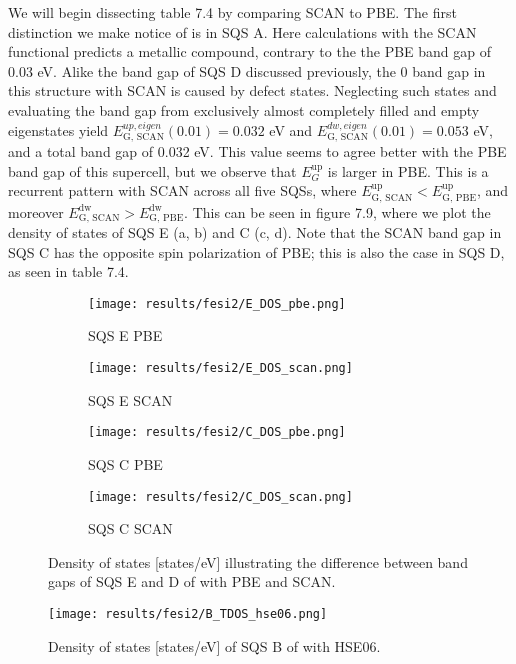 We will begin dissecting table 7.4 by comparing SCAN to PBE. The first distinction we make notice of is in SQS A. Here calculations with the SCAN functional predicts a metallic compound, contrary to the the PBE band gap of 0.03 eV. Alike the band gap of SQS D discussed previously, the 0 band gap in this structure with SCAN is caused by defect states. Neglecting such states and evaluating the band gap from exclusively almost completely filled and empty eigenstates yield $E_\text{G, SCAN} ^{up, eigen}(0.01) = 0.032$ eV and $E_\text{G, SCAN} ^{dw, eigen}(0.01) = 0.053$ eV, and a total band gap of 0.032 eV. This value seems to agree better with the PBE band gap of this supercell, but we observe that $E_G ^\text{up}$ is larger in PBE.  This is a recurrent pattern with SCAN across all five SQSs, where $E_\text{G, SCAN} ^\text{up} < E_\text{G, PBE} ^\text{up}$, and moreover $E_\text{G, SCAN} ^\text{dw} > E_\text{G, PBE} ^\text{dw}$. This can be seen in figure 7.9, where we plot the density of states of SQS E (a, b) and C (c, d). Note that the SCAN band gap in SQS C has the opposite spin polarization of PBE; this is also the case in SQS D, as seen in table 7.4.
\begin{figure}[H]
	\begin{subfigure}{.5\textwidth}
		\texttt{[image: results/fesi2/E\_DOS\_pbe.png]}
		\caption{SQS E PBE}
	\end{subfigure}
	\begin{subfigure}{.5\textwidth}
		\texttt{[image: results/fesi2/E\_DOS\_scan.png]}
		\caption{SQS E SCAN}
	\end{subfigure}
	\begin{subfigure}{.5\textwidth}
		\texttt{[image: results/fesi2/C\_DOS\_pbe.png]}
		\caption{SQS C PBE}
	\end{subfigure}
	\begin{subfigure}{.5\textwidth}
		\texttt{[image: results/fesi2/C\_DOS\_scan.png]}
		\caption{SQS C SCAN}
	\end{subfigure}
	\caption{Density of states [states/eV] illustrating the difference between band gaps of SQS E and D of  with PBE and SCAN.}
\end{figure}

\begin{figure}[H]
	\centering	
	\texttt{[image: results/fesi2/B\_TDOS\_hse06.png]}
	\caption{Density of states [states/eV] of SQS B of  with HSE06.}
\end{figure}

